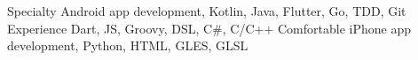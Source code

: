 
\begin{cvskills}
	\cvskill
		{Specialty}
		{
		Android app development,\enskip 
		Kotlin,\enskip
		Java,\enskip  
		Flutter,\enskip
		Go,\enskip
		TDD,\enskip 
		Git
		}
	\cvskill
		{Experience}
		{ 
		Dart,\enskip
		JS,\enskip
		Groovy,\enskip 
		DSL,\enskip
		C\#,\enskip 
		C/C++
		}
	\cvskill
		{Comfortable}
		{
		iPhone app development,\enskip 
		Python,\enskip
		HTML,\enskip
		GLES,\enskip
		GLSL
		}
\end{cvskills}

